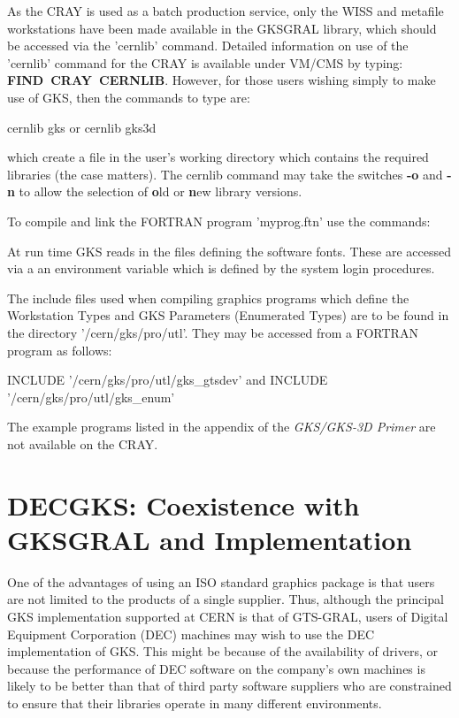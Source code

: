 As the CRAY is used as a batch production service,
only the WISS and metafile workstations have been made available in the
GKSGRAL library, which should be accessed via the 'cernlib' command.
Detailed information on use of the 'cernlib' command for the CRAY is
available under VM/CMS by typing: {\bf FIND~CRAY~CERNLIB}.
However, for those users wishing simply to make use of GKS,
then the commands to type are:
\begin{XMP}
cernlib gks
   or
cernlib gks3d
\end{XMP}
which create a file  in the user's working directory
which contains the required libraries (the case matters).
The cernlib command may take the switches {\bf -o} and {\bf -n}
to allow the selection of {\bf o}ld or {\bf n}ew library versions.
 
To compile and link the FORTRAN program 'myprog.ftn' use the commands:
 
At run time GKS reads in the files defining the software fonts.
These are accessed via a an environment variable  which is
defined by the system login procedures.
 
The include files used when compiling graphics programs which
define the Workstation Types and GKS Parameters (Enumerated Types)
are to be found in the directory '/cern/gks/pro/utl'.
They may be accessed from a FORTRAN program as follows:
\begin{XMP}
      INCLUDE '/cern/gks/pro/utl/gks_gtsdev'
       and
      INCLUDE '/cern/gks/pro/utl/gks_enum'
\end{XMP}
 
The example programs listed in the appendix of the
{\it GKS/GKS-3D Primer} are not available on the CRAY.
\section{\protect\label{sec:decgks}DECGKS: Coexistence with GKSGRAL and Implementation}
 
One of the  advantages of using an ISO standard graphics package
is that users are not limited to the products of a single supplier.
Thus, although the principal GKS implementation supported at CERN
is that of GTS-GRAL, users of Digital Equipment Corporation (DEC)
machines may wish to use the DEC implementation of GKS.
This might be because of the availability of drivers, or because
the performance of DEC software on the company's own machines is
likely to be better than that of third party software suppliers
who are constrained to ensure that their libraries operate in
many different environments.
 
